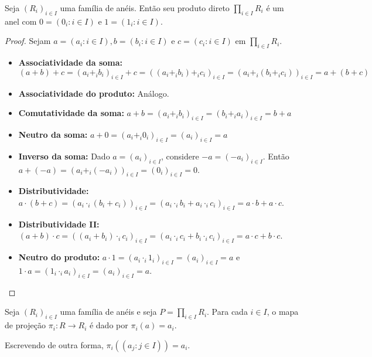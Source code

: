 \begin{lemma}
    Seja $(R_i)_{i \in I}$ uma família de anéis.
    Então seu produto direto $\prod_{i \in I}R_i$ é um anel com $0=(0_i: i \in I)$ e $1=(1_i: i \in I)$.
\end{lemma}

\begin{proof}
    Sejam $a=(a_i: i \in I), b=(b_i: i \in I)$ e $c=(c_i: i \in I)$ em $\prod_{i \in I}R_i$.
    \begin{itemize}
        \item \textbf{Associatividade da soma:} $(a+b)+c=(a_i+_i b_i)_{i \in I}+c=((a_i+_i b_i)+_ic_i)_{i \in I}=(a_i+_i (b_i+_i c_i))_{i \in I}=a+(b+c)$
        \item \textbf{Associatividade do produto:} Análogo.
        \item \textbf{Comutatividade da soma:} $a+b=(a_i+_i b_i)_{i \in I}=(b_i+_i a_i)_{i \in I}=b+a$
        \item \textbf{Neutro da soma:} $a+0=(a_i+_i 0_i)_{i \in I}=(a_i)_{i \in I}=a$
        \item \textbf{Inverso da soma:} Dado $a=(a_i)_{i \in I}$, considere $-a=(-a_i)_{i \in I}$. Então $a+(-a)=(a_i+_i (-a_i))_{i \in I}=(0_i)_{i \in I}=0$.
        \item \textbf{Distributividade:} $a\cdot (b+c)=(a_i\cdot _i (b_i+c_i))_{i \in I}=(a_i\cdot _i b_i+a_i\cdot _i c_i)_{i \in I}=a\cdot b+a\cdot c$.
        \item \textbf{Distributividade II:} $(a+b)\cdot c=((a_i+b_i)\cdot _i c_i)_{i \in I}=(a_i\cdot _i c_i+b_i\cdot _i c_i)_{i \in I}=a\cdot c+b\cdot c$.
        \item \textbf{Neutro do produto:} $a\cdot 1=(a_i\cdot _i 1_i)_{i \in I}=(a_i)_{i \in I}=a$ e $1\cdot a=(1_i\cdot _i a_i)_{i \in I}=(a_i)_{i \in I}=a$.
    \end{itemize}
\end{proof}
\begin{definition}
    Seja $(R_i)_{i \in I}$ uma família de anéis e seja $P=\prod_{i \in I}R_i$.
    Para cada $i \in I$, o mapa de projeção $\pi_i:R\rightarrow R_i$ é dado por $\pi_i(a)=a_i$.

    Escrevendo de outra forma, $\pi_i((a_j: j \in I))=a_i$.
\end{definition}

